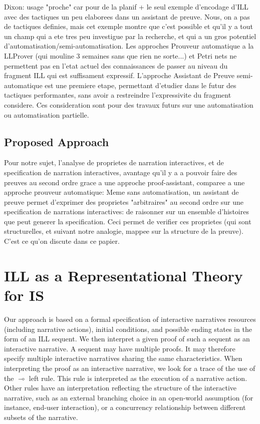 \documentclass[runningheads,a4paper]{llncs}
\begin{document}
Dixon: usage "proche" car pour de la planif + le seul exemple d'encodage d'ILL avec des tactiques un peu elaborees dans un assistant de preuve. Nous, on a pas de tactiques definies, mais cet exemple montre que c'est possible et qu'il y a tout un champ qui a ete tres peu investigue par la recherche, et qui a un gros potentiel d'automatisation/semi-automatisation. Les approches Prouveur automatique  a la LLProver (qui mouline 3 semaines sans que rien ne sorte...) et Petri nets ne permettent pas en l'etat actuel des connaissances de passer au niveau du fragment ILL qui est suffisament expressif. L'approche Assistant de Preuve semi-automatique est une premiere etape, permettant d'etudier dans le futur des tactiques performantes, sans avoir a restreindre l'expressivite du fragment considere. Ces consideration sont pour des travaux futurs sur une automatisation ou automatisation partielle.

\subsection{Proposed Approach}
Pour notre sujet, l'analyse de proprietes de narration interactives, et de specification de narration interactives, avantage qu'il y a a pouvoir faire des preuves au second ordre grace a une approche proof-assistant, comparee a une approche prouveur automatique: Meme sans automatisation, un assistant de preuve permet d'exprimer des proprietes "arbitraires" au second ordre sur une specification de narrations interactives: de raisonner sur un ensemble d'histoires que peut generer la specification. Ceci permet de verifier ces proprietes (qui sont structurelles, et suivant notre analogie, mappee sur la structure de la preuve). C'est ce qu'on discute dans ce papier.
\section{ILL as a Representational Theory for IS}
%
Our approach is based on a formal specification of interactive narratives resources (including narrative actions), initial conditions, and possible ending states in the form of an ILL sequent. We then interpret a given proof of such a sequent as an interactive narrative. A sequent may have multiple proofs. It may therefore specify multiple interactive narratives sharing the same characteristics. When interpreting the proof as an interactive narrative, we look for a trace of the use of the $\multimap$ left rule. This rule is interpreted as the execution of a narrative action. Other rules have an interpretation reflecting the structure of the interactive narrative, such as an external branching choice in an open-world assumption (for instance, end-user interaction), or a concurrency relationship between different subsets of the narrative. 
\end{document}
